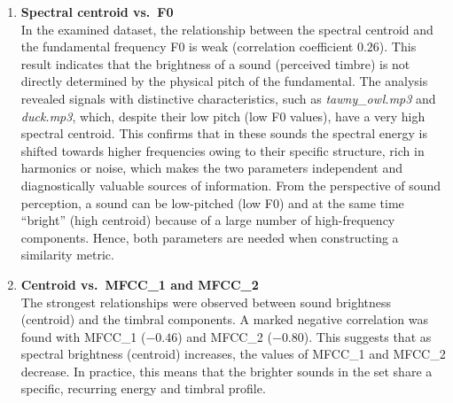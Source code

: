 \documentclass{article}
\begin{document}
\begin{enumerate}[label=\roman*.]
    \item \textbf{Spectral centroid vs.\ F0}\\
    In the examined dataset, the relationship between the spectral centroid and the fundamental frequency F0 is weak (correlation coefficient $0.26$). This result indicates that the brightness of a sound (perceived timbre) is not directly determined by the physical pitch of the fundamental. The analysis revealed signals with distinctive characteristics, such as \textit{tawny\_owl.mp3} and \textit{duck.mp3}, which, despite their low pitch (low F0 values), have a very high spectral centroid. This confirms that in these sounds the spectral energy is shifted towards higher frequencies owing to their specific structure, rich in harmonics or noise, which makes the two parameters independent and diagnostically valuable sources of information. From the perspective of sound perception, a sound can be low-pitched (low F0) and at the same time ``bright'' (high centroid) because of a large number of high-frequency components. Hence, both parameters are needed when constructing a similarity metric.

    \item \textbf{Centroid vs.\ MFCC\_1 and MFCC\_2} \\
    The strongest relationships were observed between sound brightness (centroid) and the timbral components. A marked negative correlation was found with MFCC\_1 ($-0.46$) and MFCC\_2 ($-0.80$). This suggests that as spectral brightness (centroid) increases, the values of MFCC\_1 and MFCC\_2 decrease. In practice, this means that the brighter sounds in the set share a specific, recurring energy and timbral profile.



\end{enumerate}
\end{document}
